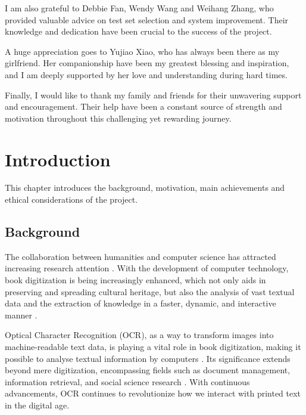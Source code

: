 \documentclass[12pt,twoside]{report}
\begin{document}
I am also grateful to Debbie Fan, Wendy Wang and Weihang Zhang, who provided valuable advice on test set selection and system improvement. Their knowledge and dedication have been crucial to the success of the project.

A huge appreciation goes to Yujiao Xiao, who has always been there as my girlfriend. Her companionship have been my greatest blessing and inspiration, and I am deeply supported by her love and understanding during hard times.

Finally, I would like to thank my family and friends for their unwavering support and encouragement. Their help have been a constant source of strength and motivation throughout this challenging yet rewarding journey.
\clearpage{\pagestyle{empty}\cleardoublepage}
{\hypersetup{hidelinks} \tableofcontents}
\fancyhead[LE,RO]{\slshape \rightmark}
\fancyhead[LO,RE]{\slshape \leftmark}
\chapter{Introduction}
This chapter introduces the background, motivation, main achievements and ethical considerations of the project.

\section{Background}
The collaboration between humanities and computer science has attracted increasing research attention \cite{duan2023disentangling}. With the development of computer technology, book digitization is being increasingly enhanced, which not only aids in preserving and spreading cultural heritage, but also the analysis of vast textual data and the extraction of knowledge in a faster, dynamic, and interactive manner \cite{tzogka2021ocr}.

Optical Character Recognition (OCR), as a way to transform images into machine-readable text data, is playing a vital role in book digitization, making it possible to analyse textual information by computers \cite{tzogka2021ocr,luscombe2020tesseract}. Its significance extends beyond mere digitization, encompassing fields such as document management, information retrieval, and social science research \cite{luscombe2020tesseract}. With continuous advancements, OCR continues to revolutionize how we interact with printed text in the digital age.
\end{document}
